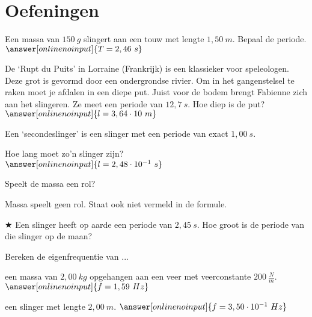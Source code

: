 \documentclass{ximera}
\begin{document}
\section{Oefeningen}

\begin{exercise}
Een massa van $150 \ g$ slingert aan een touw met lengte $1,50 \ m$. 
Bepaal de periode. \\
$\answer[onlinenoinput]{T=2,46 \ s}$
\end{exercise}


\begin{exercise}
De ‘Rupt du Puits’ in Lorraine (Frankrijk) is een klassieker voor speleologen. Deze grot is gevormd door een ondergrondse rivier. Om in het gangenstelsel te raken moet je afdalen in een diepe put. Juist voor de bodem brengt Fabienne zich aan het slingeren. Ze meet een periode van $12,7 \ s$. 
Hoe diep is de put? \\
$\answer[onlinenoinput]{l=3,64\cdot 10  \ m}$
\end{exercise}


\begin{exercise}
    Een ‘secondeslinger’ is een slinger met een periode van exact $1,00 \ s$. 
    \begin{question}
    Hoe lang moet zo’n slinger zijn?  \\
    $\answer[onlinenoinput]{l=2,48\cdot 10^{-1}\ s}$
    \end{question}

    \begin{question}
        Speelt de massa een rol?
        \begin{oplossing}
        Massa speelt geen rol. Staat ook niet vermeld in de formule.
        \end{oplossing}
    \end{question}
\end{exercise}

\begin{exercise} $\bigstar$
Een slinger heeft op aarde een periode van $2,45 \ s$. Hoe groot is de periode van die slinger op de maan? \\

\end{exercise}


\begin{exercise}
Bereken de eigenfrequentie van ...
    \begin{question}
        een massa van $2,00 \ kg$ opgehangen aan een veer met veerconstante $200 \ \frac{N}{m}$. \\
        $\answer[onlinenoinput]{f=1,59 \ Hz}$
    \end{question}

        \begin{question}
        een slinger met lengte $2,00 \ m$.
        $\answer[onlinenoinput]{f=3,50 \cdot 10^{-1} \ Hz}$
    \end{question}
\end{exercise}
\end{document}

